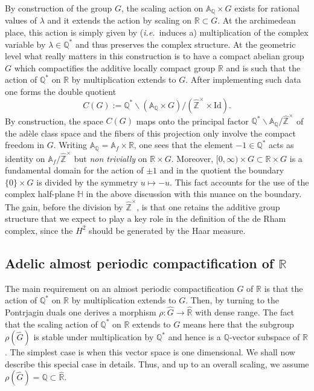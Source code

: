 \documentclass[graybox, envcountsect%
]{svmult}
\def\id{{\rm id}}
\def\A{{\mathbb A}}
\def\Q{{\mathbb Q}}
\def\R{{\mathbb R}}
\def\Z{{\mathbb Z}}
\def\H{{\mathbb H}}
\def\hatz{{\hat\Z^\times}}
\newcommand{\ie}{{\it i.e.\/}\ }
\def\no{\noindent}
\def\id{{\mbox{Id}}}
\begin{document}
\no By construction of the group $G$, the scaling action on $\A_\Q\times G$ exists  for rational values of $\lambda$ and it extends the action by scaling on $\R\subset G$. At the  archimedean place, this action is simply given by (\ie induces a) multiplication of the complex variable by $\lambda\in\Q^*$ and thus preserves the complex structure.  
  At the geometric level what really matters in this construction  is to have a compact abelian group $G$ which compactifies the additive locally compact group $\R$ and is such that the action of $\Q^*$ on $\R$ by multiplication extends  to $G$. After implementing such data one forms the double quotient
  \begin{equation}\label{doubq}
  C(G):=	\Q^*\backslash (\A_\Q\times G)/(\hatz\times \id).
  \end{equation}
  By construction, the space $C(G)$ maps onto the principal factor $\Q^*\backslash \A_\Q/\hatz$ of the ad\`ele class space and the fibers of this projection only involve the compact freedom in $G$. Writing $\A_\Q=\A_f\times \R$, one sees that the element $-1\in \Q^*$ acts as identity on $\A_f/\hatz$ but \emph{non trivially} on $\R\times G$. Moreover, $[0,\infty)\times G\subset \R\times G$ is a fundamental domain for the action of $\pm 1$ and in the quotient the boundary $\{0\}\times G$ is divided by the symmetry $u\mapsto -u$. This fact accounts for the use of the complex half-plane $\H$ in the above discussion with this nuance on the boundary. The gain, before the division by $\hatz$, is that one retains the additive group structure that we expect to play a key role in the definition of the de Rham complex, since the $H^2$ should be generated by the Haar measure. 

 \subsection{Adelic almost periodic compactification of $\R$}\label{subsec:5.1}

The main requirement on an almost periodic compactification $G$ of $\R$  is that the action of $\Q^*$ on $\R$ by multiplication extends  to $G$. Then, by turning to the Pontrjagin duals one derives a morphism $\rho:\hat G \to \hat \R$ with dense range. The fact that the scaling action of $\Q^*$ on $\R$  extends  to $G$ means here that the subgroup  $\rho(\hat G)$ is stable under multiplication 	by $\Q^*$ and hence is a $\Q$-vector subspace of $\R$. \newline
The simplest case is when this vector space is one dimensional. We shall now describe this special case in details. Thus, and up to an overall scaling, we assume  $\rho(\hat G)=\Q\subset \hat\R$.
\end{document}

